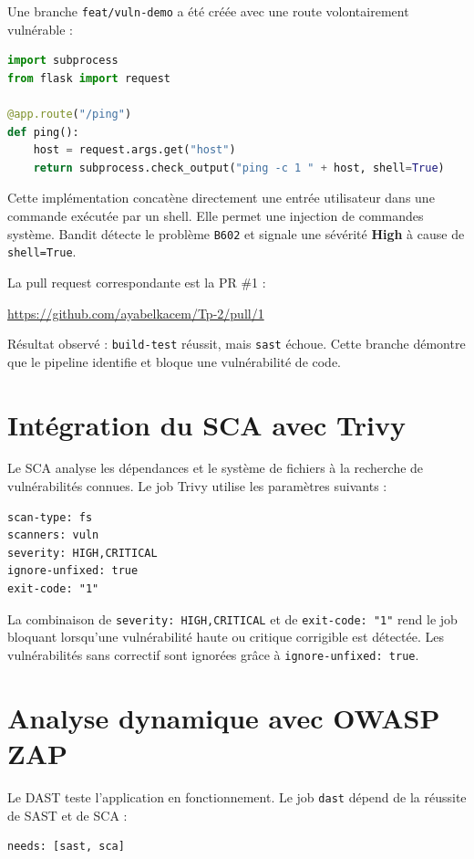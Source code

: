 \documentclass[12pt,a4paper]{article}
\begin{document}
Une branche \texttt{feat/vuln-demo} a été créée avec une route volontairement
vulnérable :
\begin{lstlisting}[language=Python]
import subprocess
from flask import request

@app.route("/ping")
def ping():
    host = request.args.get("host")
    return subprocess.check_output("ping -c 1 " + host, shell=True)
\end{lstlisting}

Cette implémentation concatène directement une entrée utilisateur dans une commande
exécutée par un shell. Elle permet une injection de commandes système. Bandit détecte
le problème \texttt{B602} et signale une sévérité \textbf{High} à cause de
\texttt{shell=True}.

La pull request correspondante est la PR \#1 :
\begin{center}
\url{https://github.com/ayabelkacem/Tp-2/pull/1}
\end{center}

Résultat observé : \texttt{build-test} réussit, mais \texttt{sast} échoue. Cette
branche démontre que le pipeline identifie et bloque une vulnérabilité de code.

\section{Intégration du SCA avec Trivy}

Le SCA analyse les dépendances et le système de fichiers à la recherche de
vulnérabilités connues. Le job Trivy utilise les paramètres suivants :
\begin{lstlisting}[language={}]
scan-type: fs
scanners: vuln
severity: HIGH,CRITICAL
ignore-unfixed: true
exit-code: "1"
\end{lstlisting}

La combinaison de \texttt{severity: HIGH,CRITICAL} et de \texttt{exit-code: "1"}
rend le job bloquant lorsqu'une vulnérabilité haute ou critique corrigible est
détectée. Les vulnérabilités sans correctif sont ignorées grâce à
\texttt{ignore-unfixed: true}.

\section{Analyse dynamique avec OWASP ZAP}

Le DAST teste l'application en fonctionnement. Le job \texttt{dast} dépend de la
réussite de SAST et de SCA :
\begin{lstlisting}[language={}]
needs: [sast, sca]
\end{lstlisting}
\end{document}
